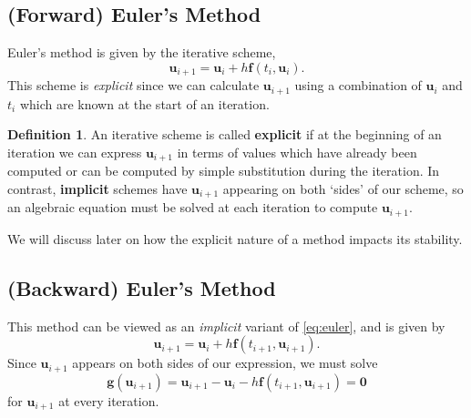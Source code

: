 \documentclass[12pt, twoside]{report}
\theoremstyle{plain}
\theoremstyle{definition}
\newtheorem{definition}{Definition}[chapter]
\theoremstyle{definition}
\begin{document}
        \subsection{(Forward) Euler's Method}
        \label{2_forward_euler}
            Euler's method is given by the iterative scheme,
            \begin{equation}
            \label{eq:euler}
                \mathbf{u}_{i+1} = \mathbf{u}_i + h\mathbf{f}(t_i, 
                \mathbf{u}_i).
            \end{equation}
            This scheme is \textit{explicit} since we can calculate 
            $\mathbf{u}_{i+1}$ using a combination of $\mathbf{u}_i$ and $t_i$
            which are known at the start of an iteration.

            \begin{definition}
                An iterative scheme is called \textbf{explicit} if at the 
                beginning of an iteration we can express $\mathbf{u}_{i+1}$ in 
                terms of values which have already been computed or can be 
                computed by simple substitution during the iteration. In 
                contrast, \textbf{implicit} schemes have $\mathbf{u}_{i+1}$ 
                appearing on both `sides' of our scheme, so an algebraic 
                equation must be solved at each iteration to compute 
                $\mathbf{u}_{i+1}$.
            \end{definition}

            We will discuss later on how the explicit nature of a method 
            impacts its stability.

        \subsection{(Backward) Euler's Method}
        \label{2_backward_euler}
            This method can be viewed as an \textit{implicit} variant of 
            \eqref{eq:euler}, and is given by
            \begin{equation}
            \label{eq:backward_euler}
                \mathbf{u}_{i+1} = \mathbf{u}_i + h\mathbf{f}(t_{i+1}, 
                \mathbf{u}_{i+1}).
            \end{equation} 
            Since $\mathbf{u}_{i+1}$ appears on both sides of our expression,
            we must solve
            \begin{equation}
            \label{eq:nonlinear_equation}
                \mathbf{g}(\mathbf{u}_{i+1}) = \mathbf{u}_{i+1} - 
                \mathbf{u}_i - h\mathbf{f}(t_{i+1}, \mathbf{u}_{i+1}) 
                = \mathbf{0}
            \end{equation}
            for $\mathbf{u}_{i+1}$ at every iteration.
\end{document}
